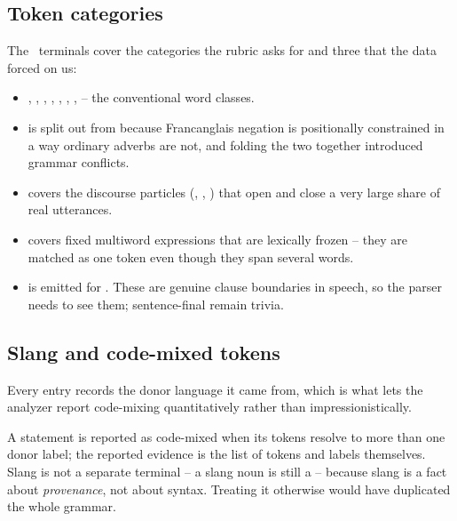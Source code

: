 \subsection{Token categories}



The \TerminalCount\ terminals cover the categories the rubric asks for and three that the
data forced on us:

\begin{itemize}[leftmargin=1.4em, itemsep=0.2em]
  \item {}, , , , , ,
        ,  -- the conventional word classes.
  \item {} is split out from  because Francanglais negation is
        positionally constrained in a way ordinary adverbs are not, and folding the two
        together introduced grammar conflicts.
  \item {} covers the discourse particles (, , ) that
        open and close a very large share of real utterances.
  \item {} covers fixed multiword expressions that are lexically frozen --
        they are matched as one token even though they span several words.
  \item {} is emitted for \term{,} \term{;} \term{:}. These are genuine clause
        boundaries in speech, so the parser needs to see them; sentence-final
         remain trivia.
\end{itemize}

\subsection{Slang and code-mixed tokens}

Every entry records the donor language it came from, which is what lets the analyzer
report code-mixing quantitatively rather than impressionistically.



A statement is reported as code-mixed when its tokens resolve to more than one donor
label; the reported evidence is the list of tokens and labels themselves. Slang is not a
separate terminal -- a slang noun is still a  -- because slang is a fact about
\emph{provenance}, not about syntax. Treating it otherwise would have duplicated the whole
grammar.

